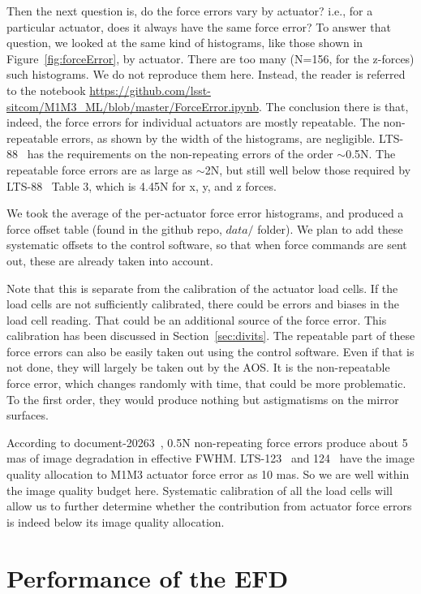 \documentclass [twoside,openbib,12pt]{article}
\begin{document}
Then the next question is, do the force errors vary by actuator? i.e.,
for a particular actuator, does it always have the same force error?
To answer that question, we looked at the same kind of histograms,
like those shown in Figure~\ref{fig:forceError}, by actuator.
There are too many (N=156, for the z-forces) such histograms. We do not
reproduce them here. Instead, the reader is referred to the notebook
\url{https://github.com/lsst-sitcom/M1M3_ML/blob/master/ForceError.ipynb}.
The conclusion there is that, indeed, the force errors for individual
actuators are mostly repeatable. The non-repeatable errors, as shown
by the width of the histograms, are negligible. LTS-88~\cite{lts88}
has the requirements on the
non-repeating errors of the order $\sim$0.5N.
The repeatable force errors are as large as $\sim$2N, but still
well below those required by LTS-88~\cite{lts88}  Table 3, which is 4.45N for x, y,
and z forces.

We took the average of the per-actuator force error histograms, and
produced a force offset table (found in the github repo, $data/$
folder). We plan to add these systematic offsets to the control
software, so that when force commands are sent out, these are already
taken into account.

Note that this is separate from the calibration of
the actuator load cells. If the load cells are not sufficiently calibrated,
there could be errors and biases in the load cell reading. That could
be an additional source of the force error.
This calibration has been discussed in Section~\ref{sec:divits}.
The repeatable part of these force errors can also be easily taken out
using the control software. Even if that is not done, they will
largely be taken out by the AOS.
It is the non-repeatable force error, which changes randomly with
time, that could be more problematic.
To the first order, they would produce nothing but astigmatisms on the mirror
surfaces.

According to document-20263~\cite{m1m3faccuracy}, 0.5N non-repeating force errors produce
about 5 mas of image degradation in effective FWHM.
LTS-123~\cite{lts123} and 124~\cite{lts124} have the image quality allocation to M1M3 actuator
force error as 10 mas. So we are well within the image quality budget
here.
Systematic calibration of all the load cells will allow us to further
determine whether the contribution from actuator force errors is
indeed below its image quality allocation.

\section{Performance of the EFD}
\label{sec:efd}
\end{document}
